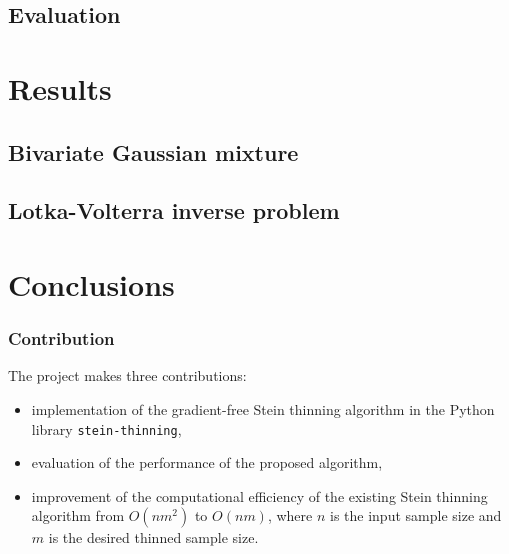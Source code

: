\documentclass{beamer}
\begin{document}
\subsection{Evaluation}

\section{Results}

\subsection{Bivariate Gaussian mixture}

\subsection{Lotka-Volterra inverse problem}

\section{Conclusions}

\begin{frame}
\frametitle{Contribution}

The project makes three contributions:
\begin{itemize}
\item implementation of the gradient-free Stein thinning algorithm in the Python library \texttt{stein-thinning},
\item evaluation of the performance of the proposed algorithm,
\item improvement of the computational efficiency of the existing Stein thinning algorithm from $O(nm^2)$ to $O(nm)$, where $n$ is the input sample size and $m$ is the desired thinned sample size.
\end{itemize}

\end{frame}
\end{document}

